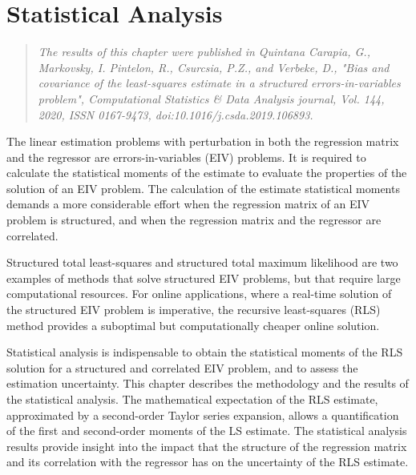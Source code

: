 
\glsresetall

\chapter{Statistical Analysis} \label{chap:StatisticalAnalysis}


\begin{quote}
\vspace{-0.5cm}
\emph{The results of this chapter were published in Quintana Carapia, G., Markovsky, I. Pintelon, R., Csurcsia, P.Z., and Verbeke, D., "Bias and covariance of the least-squares estimate in a structured errors-in-variables problem", Computational Statistics & Data Analysis journal, Vol. 144, 2020, ISSN 0167-9473, doi:10.1016/j.csda.2019.106893. \nocite{QuintanaCSDA} }\vfill{}
\end{quote}




The linear estimation problems with perturbation in both the regression matrix and the regressor are errors-in-variables (EIV) problems.
It is required to calculate the statistical moments of the estimate to evaluate the properties of the solution of an EIV problem.
The calculation of the estimate statistical moments demands a more considerable effort when the regression matrix of an EIV problem is structured, and when the regression matrix and the regressor are correlated.

Structured total least-squares and structured total maximum likelihood are two examples of methods that solve structured EIV problems, but that require large computational resources.
For online applications, where a real-time solution of the structured EIV problem is imperative, the recursive least-squares (RLS) method provides a suboptimal but computationally cheaper online solution.

Statistical analysis is indispensable to obtain the statistical moments of the RLS solution for a structured and correlated EIV problem, and to assess the estimation uncertainty.
This chapter describes the methodology and the results of the statistical analysis.
The mathematical expectation of the RLS estimate, approximated by a second-order Taylor series expansion, allows a quantification of the first and second-order moments of the LS estimate.
The statistical analysis results provide insight into the impact that the structure of the regression matrix and its correlation with the regressor has on the uncertainty of the RLS estimate.

